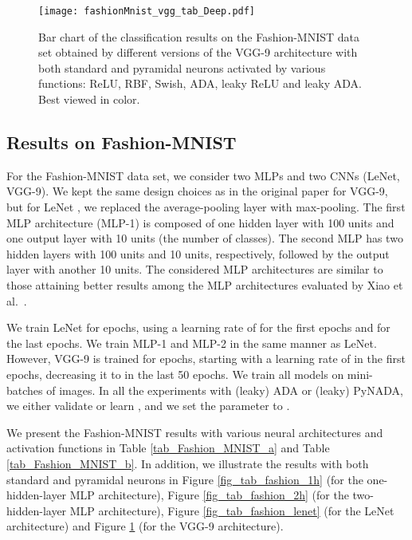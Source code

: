 \documentclass[pdflatex,sn-mathphys]{sn-jnl}
\theoremstyle{thmstyleone}
\theoremstyle{thmstyletwo}\newtheorem{example}{Example}\newtheorem{remark}{Remark}
\theoremstyle{thmstylethree}\newtheorem{definition}{Definition}\DeclareMathOperator{\sinc}{sinc}
\begin{document}
\begin{figure}[!t]
\begin{center}
\centerline{\texttt{[image: fashionMnist\_vgg\_tab\_Deep.pdf]}}
\caption{Bar chart of the classification results on the Fashion-MNIST data set obtained by different versions of the VGG-9 architecture with both standard and pyramidal neurons activated by various functions: ReLU, RBF, Swish, ADA, leaky ReLU and leaky ADA. Best viewed in color.}
\label{fig_tab_fashion_vgg}
\end{center}
\end{figure}

\subsection{Results on Fashion-MNIST}
\label{sec_results_fashion}

For the Fashion-MNIST data set, we consider two MLPs and two CNNs (LeNet, VGG-9).
We kept the same design choices as in the original paper \citep{Simonyan-ICLR-2014} for VGG-9, but for LeNet \citep{LeCun-PI-1998}, we replaced the average-pooling layer with max-pooling. The first MLP architecture (MLP-1) is composed of one hidden layer with 100 units and one output layer with 10 units (the number of classes). The second MLP has two hidden layers with 100 units and 10 units, respectively, followed by the output layer with another 10 units. The considered MLP architectures are similar to those attaining better results among the MLP architectures evaluated by Xiao et al.~\cite{Xiao-A-2017}.

We train LeNet for  epochs, using a learning rate of  for the first  epochs and  for the last  epochs. We train MLP-1 and MLP-2 in the same manner as LeNet. However, VGG-9 is trained for  epochs, starting with a learning rate of  in the first  epochs, decreasing it to  in the last 50 epochs. We train all models on mini-batches of  images. In all the experiments with (leaky) ADA or (leaky) PyNADA, we either validate or learn , and we set the parameter  to .

We present the Fashion-MNIST results with various neural architectures and activation functions in Table \ref{tab_Fashion_MNIST_a} and Table \ref{tab_Fashion_MNIST_b}. In addition, we illustrate the results with both standard and pyramidal neurons in Figure \ref{fig_tab_fashion_1h} (for the one-hidden-layer MLP architecture), Figure \ref{fig_tab_fashion_2h} (for the two-hidden-layer MLP architecture), Figure \ref{fig_tab_fashion_lenet} (for the LeNet architecture) and Figure \ref{fig_tab_fashion_vgg} (for the VGG-9 architecture).
\end{document}
